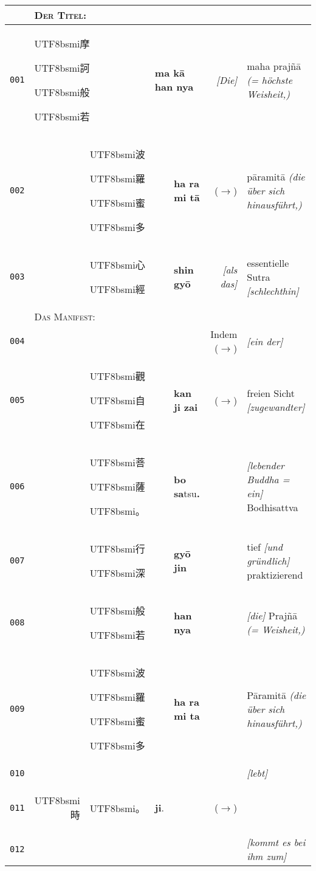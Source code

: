 \documentclass[
DIV=calc,
BCOR=5mm,
11pt,
headings=small,
oneside,
bibtotocnumbered]{scrartcl}
\newcommand{\cnbsmi}[1]{\begin{CJK}{UTF8}{bsmi}#1\end{CJK}}
\begin{document}
\begin{center}
\begin{tabular}{r|rl|rl|rl}
~ & \multicolumn{6}{l}{\textsc{Der Titel:}}\\
\hline
{\tiny\texttt{001}}&
  \multicolumn{2}{l|}{\cnbsmi{摩}  \cnbsmi{訶} \cnbsmi{般} \cnbsmi{若}} &
  \multicolumn{2}{l|}{\textbf{ma kā}  \textbf{han nya}} &
  \textrm{\emph{[Die]}}& \textrm{maha prajñā \emph{(= höchste Weisheit,)}}\\
{\tiny\texttt{002}}&
  ~ & \cnbsmi{波} \cnbsmi{羅} \cnbsmi{蜜} \cnbsmi{多} & 
  ~ & \textbf{ha ra mi tā} & 
  {\tiny \textrm{($\rightarrow$)}} & 
    \textrm{pāramitā \emph{(die über sich hinausführt,)}}\\
{\tiny\texttt{003}}& 
  ~ & \cnbsmi{心} \cnbsmi{經} &
  ~ & \textbf{shin gyō} & 
  \textrm{\emph{[als das]}} & \textrm{essentielle Sutra \emph{[schlechthin]}} \\
\hline
~ & \multicolumn{6}{l}{\textsc{Das Manifest:}}\\
\hline
{\tiny\texttt{004}}& 
~ & ~  & ~ & ~ &
  \textrm{Indem} {\tiny \textrm{($\rightarrow$)}} & \textrm{\emph{[ein der]}} \\
{\tiny\texttt{005}}&
  ~ & \cnbsmi{觀} \cnbsmi{自} \cnbsmi{在} & 
  ~ & \textbf{kan ji zai} & 
  {\tiny \textrm{($\rightarrow$)}} &
    \textrm{freien Sicht \emph{[zugewandter]}} \\
{\tiny\texttt{006}}&
  ~ & \cnbsmi{菩} \cnbsmi{薩} \cnbsmi{。}& 
  ~ & \textbf{bo} \textbf{sa}\tiny{tsu}\textbf{.}& 
  ~ & \textrm{\emph{[lebender Buddha = ein]} Bodhisattva} \\  
{\tiny\texttt{007}}& 
  ~ & \cnbsmi{行} \cnbsmi{深} &
  ~ & \textbf{gyō} \textbf{jin} & 
  ~ & \textrm{tief \emph{[und gründlich]} praktizierend} \\  
{\tiny\texttt{008}}& 
  ~ & \cnbsmi{般} \cnbsmi{若} & 
  ~ & \textbf{han nya} & 
  ~ & \textrm{\emph{[die]} Prajñā \emph{(= Weisheit,)}} \\  
{\tiny\texttt{009}} &
  ~ & \cnbsmi{波} \cnbsmi{羅} \cnbsmi{蜜} \cnbsmi{多}& 
  ~ & \textbf{ha ra mi ta} & 
  ~ & \textrm{Pāramitā \emph{(die über sich hinausführt,)}} \\  
{\tiny\texttt{010}}&
  ~ & ~  & ~ & ~ &  ~ & \textrm{\emph{[lebt]}} \\
{\tiny\texttt{011}}&
  \cnbsmi{時}&\cnbsmi{。} &
  \textbf{ji}. & ~ &
  {\tiny \textrm{($\rightarrow$)}} & ~ \\
{\tiny\texttt{012}}& 
  ~ & ~ & ~ & ~ & ~ & \textrm{\emph{[kommt es bei ihm zum]}} \\

\end{tabular}
\end{center}
\end{document}
